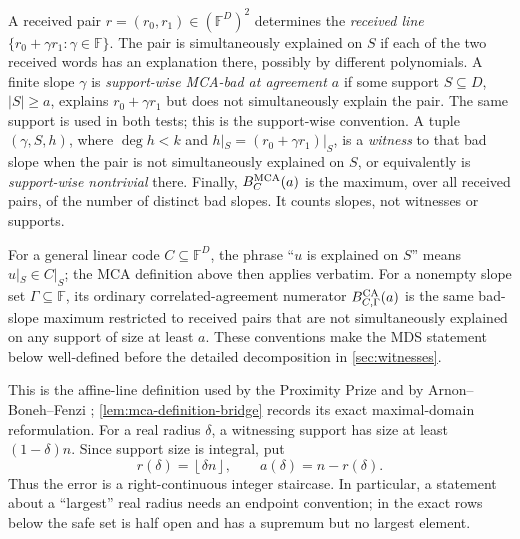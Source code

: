 \documentclass[11pt,a4paper]{amsart}
\numberwithin{equation}{section}
\theoremstyle{remark}
\newcommand{\F}{\mathbb F}
\newcommand{\abs}[1]{\lvert #1\rvert}
\newcommand{\floor}[1]{\left\lfloor #1\right\rfloor}
\begin{document}
A received pair \(r=(r_0,r_1)\in(\F^D)^2\) determines the
\emph{received line} \(\{r_0+\gamma r_1:\gamma\in\F\}\).  The pair is
simultaneously explained on \(S\) if each of the two received words has an explanation
there, possibly by different polynomials.  A finite slope \(\gamma\) is
\emph{support-wise MCA-bad at agreement \(a\)} if some support
\(S\subseteq D\), \(\abs S\ge a\), explains
\(r_0+\gamma r_1\) but does not simultaneously explain the pair.  The
same support is used in both tests; this is the support-wise convention.
A tuple \((\gamma,S,h)\), where \(\deg h<k\) and
\(h|_S=(r_0+\gamma r_1)|_S\), is a \emph{witness} to that bad slope when
the pair is not simultaneously explained on \(S\), or equivalently is
\emph{support-wise nontrivial} there.  Finally,
\(B_C^{\rm MCA}(a)\) is the maximum, over all received pairs, of the
number of distinct bad slopes.  It counts slopes, not witnesses or
supports.

For a general linear code \(C\subseteq\F^D\), the phrase ``\(u\) is
explained on \(S\)'' means \(u|_S\in C|_S\); the MCA definition above
then applies verbatim.  For a nonempty slope set \(\Gamma\subseteq\F\),
its ordinary correlated-agreement numerator
\(B_{C,\Gamma}^{\rm CA}(a)\) is the same bad-slope maximum restricted to
received pairs that are not simultaneously explained on any support of
size at least \(a\).  These conventions make the MDS statement below
well-defined before the detailed decomposition in \cref{sec:witnesses}.

This is the affine-line definition used by the Proximity Prize
\cite{ProximityPrize} and by Arnon--Boneh--Fenzi
\cite[Definition~4.3]{ABF26};
\cref{lem:mca-definition-bridge} records its exact maximal-domain
reformulation.  For a real radius \(\delta\), a witnessing
support has size at least \((1-\delta)n\).  Since support size is integral,
put
\[
 r(\delta)=\floor{\delta n},\qquad a(\delta)=n-r(\delta).
\]
Thus the error is a right-continuous integer staircase.  In particular, a
statement about a ``largest'' real radius needs an endpoint convention;
in the exact rows below the safe set is half open and has a supremum but no
largest element.
\end{document}

